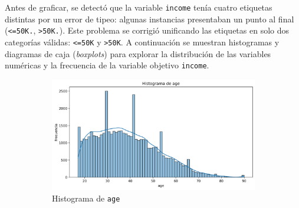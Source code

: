 \documentclass[12pt,a4paper]{article}
\begin{document}
\begin{enumerate}
    Antes de graficar, se detectó que la variable \texttt{income} tenía cuatro etiquetas distintas por un 
    error de tipeo: algunas instancias presentaban un punto al final (\texttt{<=50K.}, \texttt{>50K.}). Este problema se 
    corrigió unificando las etiquetas en solo dos categorías válidas: \texttt{<=50K} y \texttt{>50K}. A continuación se 
    muestran histogramas y diagramas de caja (\textit{boxplots}) para explorar la distribución de las variables numéricas y 
    la frecuencia de la variable objetivo \texttt{income}.

    \begin{figure}[H]
      \centering
      \begin{subfigure}[b]{0.45\textwidth}
        \includegraphics[width=\textwidth]{histogram_age.png}
        \caption{Histograma de \texttt{age}}
        \label{fig:age_hist}
      \end{subfigure}
      \hfill
      \begin{subfigure}[b]{0.45\textwidth}

\end{subfigure}
\end{figure}
\end{enumerate}
\end{document}
